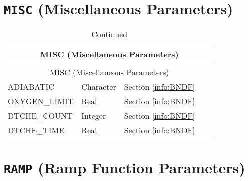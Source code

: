 \vspace{\baselineskip}


\section{\texorpdfstring{{\tt MISC}}{MISC} (Miscellaneous Parameters)}

\begin{longtable}{@{\extracolsep{\fill}}|l|l|l|l|l|}
\caption[Boundary file parameters ({\ct MISC} namelist group)]{For more information see Section~\ref{info:BNDF}.}
\label{tbl:MISC} \\
\hline
\multicolumn{5}{|c|}{{\ct MISC} (Miscellaneous Parameters)} \\
\hline \hline
\endfirsthead
\caption[]{Continued} \\
\hline
\multicolumn{5}{|c|}{{\ct MISC} (Miscellaneous Parameters)} \\
\hline \hline
\endhead
{\ct ADIABATIC}        & Character   & Section \ref{info:BNDF}                 &           &                 \\ \hline
{\ct OXYGEN\_LIMIT}        & Real   & Section \ref{info:BNDF}                 &           &                 \\ \hline
{\ct DTCHE\_COUNT}        & Integer   & Section \ref{info:BNDF}                 &           &                 \\ \hline
{\ct DTCHE\_TIME}        & Real   & Section \ref{info:BNDF}                 &           &                 \\ \hline
\end{longtable}

\vspace{\baselineskip}


\section{\texorpdfstring{{\tt RAMP}}{RAMP} (Ramp Function Parameters)}

